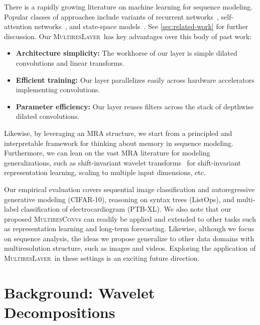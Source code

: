 \documentclass{article}
\theoremstyle{plain}
\theoremstyle{definition}
\theoremstyle{remark}
\newcommand{\ourlayer}{\textsc{MultiresLayer}}
\newcommand{\ourconv}{\textsc{MultiresConv}}
\begin{document}
There is a rapidly growing literature on machine learning for sequence modeling. Popular classes of approaches include variants of recurrent networks~\citep{hochreiter1997long}, self-attention networks~\citep{vaswani2017attention}, and state-space models~\citep{gu2021efficiently}. See \cref{sec:related-work} for further discussion.
Our \ourlayer\ has key advantages over this body of past work:
\begin{itemize}\vspace{-0.1in}
\itemsep0em
    \item \textbf{Architecture simplicity:} The workhorse of our layer is simple dilated convolutions and linear transforms.
    \item \textbf{Efficient training:} Our layer parallelizes easily across hardware accelerators implementing convolutions.
    \item \textbf{Parameter efficiency:} Our layer reuses filters across the stack of depthwise dilated convolutions.
\end{itemize}
\vspace{-0.1in}
Likewise, by leveraging an MRA structure, we start from a principled and interpretable framework for thinking about memory in sequence modeling. Furthermore, we can lean on the vast MRA literature for modeling generalizations, such as shift-invariant wavelet transforms~\cite{kingsbury1998dual,selesnick2005dual} for shift-invariant representation learning, scaling to multiple input dimensions, etc.

Our empirical evaluation covers 
sequential image classification and autoregressive generative modeling (CIFAR-10), reasoning on syntax trees (ListOps), and multi-label classification of electrocardiogram (PTB-XL). 
We also note that our proposed \ourconv s can readily be applied and extended to other tasks such as representation learning 
and long-term forecasting. 
Likewise, although we focus on sequence analysis, the ideas we propose generalize to other data domains with multiresolution structure, such as images and videos.
Exploring the application of \ourlayer\ in these settings is an exciting future direction. 





\section{Background: Wavelet Decompositions}
\label{sec:wavelet-background}
\end{document}

